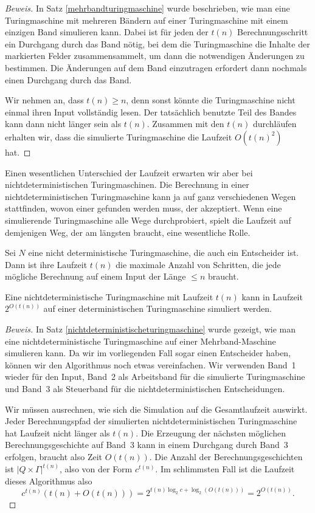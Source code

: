 \begin{proof}[Beweis]
In Satz \ref{mehrbandturingmaschine} wurde beschrieben, wie man eine
Turingmaschine mit mehreren Bändern auf einer Turingmaschine mit
einem einzigen Band simulieren kann. Dabei ist für jeden der
$t(n)$ Berechnungsschritt ein Durchgang durch das Band nötig, bei
dem die Turingmaschine die Inhalte der markierten Felder zusammensammelt,
um dann die notwendigen Änderungen zu bestimmen. Die Änderungen
auf dem Band einzutragen erfordert dann nochmals einen Durchgang
durch das Band.

Wir nehmen an, dass $t(n)\ge n$, denn sonst könnte die
Turingmaschine nicht einmal ihren Input vollständig lesen.
Der tatsächlich benutzte Teil des Bandes kann dann nicht länger sein
als $t(n)$. Zusammen mit den $t(n)$ durchläufen erhalten wir,
dass die simulierte Turingmaschine die Laufzeit $O(t(n)^2)$ hat.
\end{proof}

Einen wesentlichen Unterschied der Laufzeit erwarten wir aber
bei nichtdeterministischen Turingmaschinen.
Die Berechnung in einer nichtdeterministischen Turingmaschine
kann ja auf ganz verschiedenen Wegen stattfinden, wovon
einer gefunden werden muss, der akzeptiert. Wenn eine simulierende
Turingmaschine alle Wege durchprobiert, spielt die Laufzeit auf
demjenigen Weg, der am längsten braucht, eine wesentliche Rolle.

\begin{definition}
Sei $N$ eine nicht deterministische Turingmaschine, die auch ein
Entscheider ist. Dann ist ihre Laufzeit $t(n)$ die maximale Anzahl
von Schritten, die jede mögliche Berechnung auf einem Input der
Länge $\le n$ braucht.
\end{definition}

\begin{satz}
\label{exponentialtime}
Eine nichtdeterministische Turingmaschine mit Laufzeit $t(n)$
kann in Laufzeit $2^{O(t(n))}$
auf einer deterministischen Turingmaschine simuliert werden.
\end{satz}

\begin{proof}[Beweis]
In Satz \ref{nichtdeterministischeturingmaschine} wurde gezeigt,
wie man eine nichtdeterministische Turingmaschine auf einer
Mehrband-Maschine simulieren kann. Da wir im vorliegenden Fall
sogar einen Entscheider haben, können wir den Algorithmus noch
etwas vereinfachen. Wir verwenden Band~1 wieder für den Input,
Band~2 als Arbeitsband für die simulierte Turingmaschine und
Band~3 als Steuerband für die nichtdeterministischen
Entscheidungen.

Wir müssen ausrechnen, wie sich die Simulation auf die 
Gesamtlaufzeit auswirkt. Jeder Berechnungspfad der simulierten
nichtdeterministischen Turingmaschine hat Laufzeit nicht
länger als $t(n)$. Die Erzeugung der nächsten möglichen
Berechnungsgeschichte auf Band~3 kann in einem Durchgang
durch Band~3 erfolgen, braucht also Zeit $O(t(n))$.
Die Anzahl der Berechnungsgeschichten ist $|Q\times \Gamma|^{t(n)}$,
also von der Form $c^{t(n)}$. Im schlimmsten Fall ist die
Laufzeit dieses Algorithmus also
\[
c^{t(n)}(t(n) + O(t(n)))
=
2^{t(n) \log_2 c+ \log_2(O(t(n)))}
=
2^{O(t(n))}.
\]
\end{proof}
